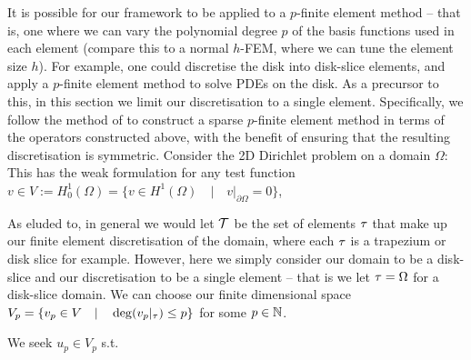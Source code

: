 It is possible for our framework to be applied to a $p$-finite element method -- that is, one where we can vary the polynomial degree $p$ of the basis functions used in each element (compare this to a normal $h$-FEM, where we can tune the element size $h$). For example, one could discretise the disk into disk-slice elements, and apply a $p$-finite element method to solve PDEs on the disk. As a precursor to this, in this section we limit our discretisation to a single element. Specifically, we follow the method of \cite{beuchler2006new} to construct a sparse $p$-finite element method in terms of the operators constructed above, with the benefit of ensuring that the resulting discretisation is symmetric. Consider the 2D Dirichlet problem on a domain $\Omega$:
This has the weak formulation for any test function $v \in V := H_0^1(\Omega) = \{v \in H^1(\Omega) \quad | \quad v|_{\partial \Omega} = 0 \}$,

As eluded to, in general we would let $\mathcal{T}$ be the set of elements $\tau$ that make up our finite element discretisation of the domain, where each $\tau$ is a trapezium or disk slice for example. However, here we simply consider our domain to be a disk-slice and our discretisation to be a single element -- that is we let $\tau = \Omega$ for a disk-slice domain. We can choose our finite dimensional space $V_p = \{ v_p \in V \quad | \quad \deg(v_p|_\tau) \le p \}$ for some $p \in \mathbb{N}$.

We seek $u_p \in V_p$ s.t.

